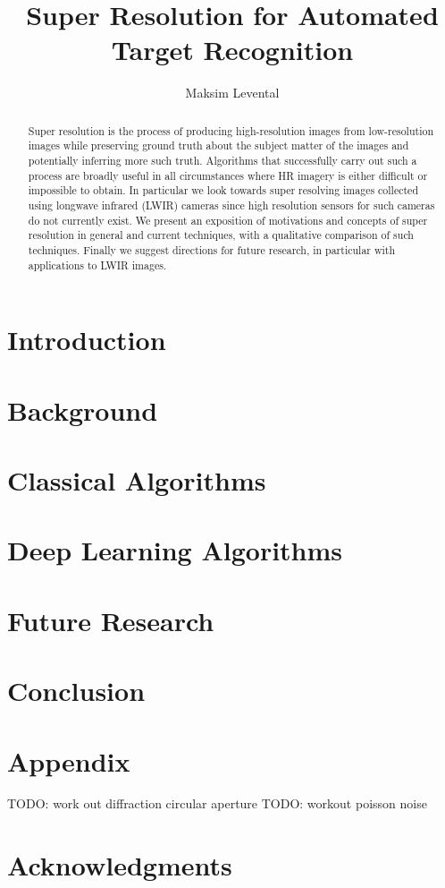 \documentclass[journal]{IEEEtran}
\begin{document}
    \title{Super Resolution for Automated Target Recognition}
    \author{Maksim Levental}
    \maketitle

    \begin{abstract}
        Super resolution is the process of producing high-resolution images from low-resolution images while preserving ground truth about the subject matter of the images and potentially inferring more such truth.
        Algorithms that successfully carry out such a process are broadly useful in all circumstances where HR imagery is either difficult or impossible to obtain.
        In particular we look towards super resolving images collected using longwave infrared (LWIR) cameras since high resolution sensors for such cameras do not currently exist.
        We present an exposition of motivations and concepts of super resolution in general and current techniques, with a qualitative comparison of such techniques.
        Finally we suggest directions for future research, in particular with applications to LWIR images.
    \end{abstract}

    \section{Introduction}\label{sec:introduction}
    

    \section{Background}\label{sec:background}

    \section{Classical Algorithms}\label{sec:classical-algorithms}
    \section{Deep Learning Algorithms}\label{sec:deep-learning-algorithms}
    \section{Future Research}\label{sec:future-research}
    \section{Conclusion}\label{sec:conclusion}
    \section{Appendix}\label{sec:appendix}
    TODO: work out diffraction circular aperture
    TODO: workout poisson noise
    \section*{Acknowledgments}
    \newpage
    \printbibliography
\end{document}
